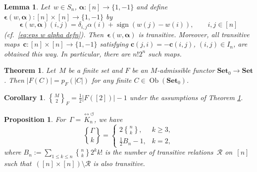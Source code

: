 \documentclass[10pt,a4paper]{amsart}
\newtheorem{lemma}{Lemma}
\newtheorem{theorem}{Theorem}
\newtheorem{corollary}{Corollary}
\newtheorem{proposition}{Proposition}
\DeclareMathOperator*{\Ob}{Ob}
\DeclareMathOperator{\sign}{sign}
\newcommand{\stirling}[2]{\genfrac{\{}{\}}{0pt}0{#1}{#2}}
\newcommand{\tstirling}[2]{\genfrac{\{}{\}}{0pt}1{#1}{#2}}
\begin{document}
\begin{lemma}\label{lem:In trans to trans}
Let~$w\in S_n$, $\boldsymbol{\alpha}:[n]\to \{1,-1\}$ and define $\boldsymbol\epsilon(w,\boldsymbol{\alpha}):[n]\times[n]\to \{1,-1\}$ by
$$
\boldsymbol\epsilon(w,\boldsymbol{\alpha})(i,j)=\delta_{i,j}\alpha(i)+
\sign(w(j)-w(i)),\qquad i,j\in [n]
$$
(cf.~\eqref{eq:eps w alpha defn}).
Then~$\boldsymbol\epsilon(w,\boldsymbol{\alpha})$ is transitive. Moreover,
all transitive maps~$\mathbf c:[n]\times[n]\to\{1,-1\}$ satisfying
$\mathbf c(j,i)=-\mathbf c(i,j)$, $(i,j)\in I_n$, are obtained this way.
In particular, there are $n! 2^n$ such maps.
\end{lemma}

\begin{theorem}
\label{th:polynomial} 
Let~$M$ be a finite set and $F$ be an $M$-admissible functor $\mathbf{Set}_0\to \mathbf{Set}$. Then
$|F(C)|=p_F(|C|)$ 
for any finite $C\in \Ob(\mathbf{Set}_0)$.
\end{theorem}

\begin{corollary}\label{cor:stirling F2}
$\tstirling{M}{2}_F=\frac{1}{2}|F([2])|-1$ under the assumptions of Theorem \ref{th:polynomial}. 
\end{corollary}

\begin{proposition}\label{prop:enum trans}
For~$\Gamma=\overset{\leftrightarrow\circlearrowleft}{K_n}$, we have $$
\stirling{\Gamma}{k}=\begin{cases}2\stirling{n}{k},& k\ge 3,\\\tfrac12 B_n-1,&k=2,
\end{cases}
$$
where
$B_n :=\sum\limits_{1\le k\le n} \tstirling{n}{k}2^k k!$
is the number of transitive relations~$\mathscr R$ on~$[n]$ such that~$([n]\times [n])\setminus\mathscr R$ is also transitive.
\end{proposition}
\end{document}
